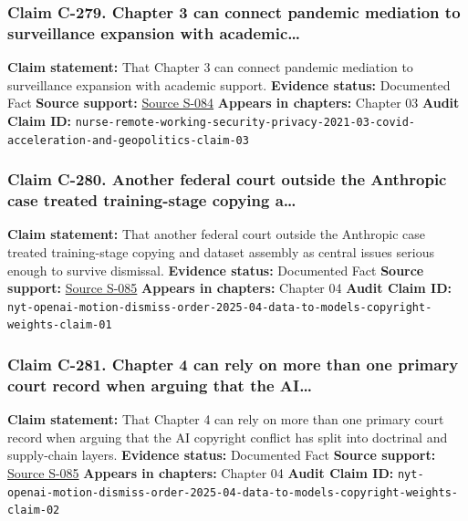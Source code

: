\documentclass[
  american,
  11pt,
  letterpaper,
]{article}
\begin{document}
\subsubsection{Claim C-279. Chapter 3 can connect pandemic mediation to
surveillance expansion with
academic\ldots{}}\label{claim-c-279-chapter-3-can-connect-pandemic-mediation-to-surveillance-expansion-with-academic}

\textbf{Claim statement:} That Chapter 3 can connect pandemic mediation
to surveillance expansion with academic support. \textbf{Evidence
status:} Documented Fact \textbf{Source support:}
\hyperref[source-s-084-remote-working-pre-and-post-covid-19-an-analysis-of-new-threats-and-risks-to-security-and-privacy]{Source
S-084} \textbf{Appears in chapters:} Chapter 03 \textbf{Audit Claim ID:}
\texttt{nurse-remote-working-security-privacy-2021-03-covid-acceleration-and-geopolitics-claim-03}

\subsubsection{Claim C-280. Another federal court outside the Anthropic
case treated training-stage copying
a\ldots{}}\label{claim-c-280-another-federal-court-outside-the-anthropic-case-treated-training-stage-copying-a}

\textbf{Claim statement:} That another federal court outside the
Anthropic case treated training-stage copying and dataset assembly as
central issues serious enough to survive dismissal. \textbf{Evidence
status:} Documented Fact \textbf{Source support:}
\hyperref[source-s-085-the-new-york-times-company-v-microsoft-corporation-et-al-opinion-on-motions-to-dismiss]{Source
S-085} \textbf{Appears in chapters:} Chapter 04 \textbf{Audit Claim ID:}
\texttt{nyt-openai-motion-dismiss-order-2025-04-data-to-models-copyright-weights-claim-01}

\subsubsection{Claim C-281. Chapter 4 can rely on more than one primary
court record when arguing that the
AI\ldots{}}\label{claim-c-281-chapter-4-can-rely-on-more-than-one-primary-court-record-when-arguing-that-the-ai}

\textbf{Claim statement:} That Chapter 4 can rely on more than one
primary court record when arguing that the AI copyright conflict has
split into doctrinal and supply-chain layers. \textbf{Evidence status:}
Documented Fact \textbf{Source support:}
\hyperref[source-s-085-the-new-york-times-company-v-microsoft-corporation-et-al-opinion-on-motions-to-dismiss]{Source
S-085} \textbf{Appears in chapters:} Chapter 04 \textbf{Audit Claim ID:}
\texttt{nyt-openai-motion-dismiss-order-2025-04-data-to-models-copyright-weights-claim-02}
\end{document}
